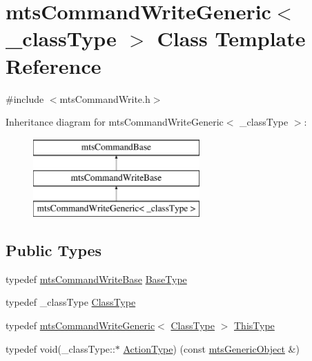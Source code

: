 \hypertarget{classmts_command_write_generic}{}\section{mts\+Command\+Write\+Generic$<$ \+\_\+class\+Type $>$ Class Template Reference}
\label{classmts_command_write_generic}


{\ttfamily \#include $<$mts\+Command\+Write.\+h$>$}

Inheritance diagram for mts\+Command\+Write\+Generic$<$ \+\_\+class\+Type $>$\+:\begin{figure}[H]
\begin{center}
\leavevmode
\includegraphics[height=3.000000cm]{d9/d24/classmts_command_write_generic}
\end{center}
\end{figure}
\subsection*{Public Types}
\begin{DoxyCompactItemize}
\item 
typedef \hyperlink{classmts_command_write_base}{mts\+Command\+Write\+Base} \hyperlink{classmts_command_write_generic_aa2dd1b534b1f880987ed8b47edbc6b8b}{Base\+Type}
\item 
typedef \+\_\+class\+Type \hyperlink{classmts_command_write_generic_ab4ffe009b7558cff08d309ba7dfb1235}{Class\+Type}
\item 
typedef \hyperlink{classmts_command_write_generic}{mts\+Command\+Write\+Generic}$<$ \hyperlink{classmts_command_write_generic_ab4ffe009b7558cff08d309ba7dfb1235}{Class\+Type} $>$ \hyperlink{classmts_command_write_generic_adaaf201d0985787a45e6b4177f724972}{This\+Type}
\item 
typedef void(\+\_\+class\+Type\+::$\ast$ \hyperlink{classmts_command_write_generic_aa941087c4b92213fe1b6b670f4ce5a36}{Action\+Type}) (const \hyperlink{classmts_generic_object}{mts\+Generic\+Object} \&)
\end{DoxyCompactItemize}
